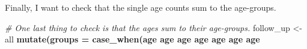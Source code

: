 \documentclass[
]{book}
\newenvironment{Shaded}{\begin{snugshade}}{\end{snugshade}}
\newcommand{\CommentTok}[1]{\textcolor[rgb]{0.56,0.35,0.01}{\textit{#1}}}
\newcommand{\DataTypeTok}[1]{\textcolor[rgb]{0.13,0.29,0.53}{#1}}
\newcommand{\KeywordTok}[1]{\textcolor[rgb]{0.13,0.29,0.53}{\textbf{#1}}}
\newcommand{\NormalTok}[1]{#1}
\newcommand{\OperatorTok}[1]{\textcolor[rgb]{0.81,0.36,0.00}{\textbf{#1}}}
\newcommand{\StringTok}[1]{\textcolor[rgb]{0.31,0.60,0.02}{#1}}
\begin{document}
Finally, I want to check that the single age counts sum to the age-groups.

\begin{Shaded}
\begin{Highlighting}[]
\CommentTok{# One last thing to check is that the ages sum to their age-groups.}
\NormalTok{follow_up <-}\StringTok{ }
\StringTok{  }\NormalTok{all }\OperatorTok{%
\StringTok{  }\KeywordTok{mutate}\NormalTok{(}\DataTypeTok{groups =} \KeywordTok{case_when}\NormalTok{(age }\OperatorTok{%
\NormalTok{                            age }\OperatorTok{%
\NormalTok{                            age }\OperatorTok{%
\NormalTok{                            age }\OperatorTok{%
\NormalTok{                            age }\OperatorTok{%
\NormalTok{                            age }\OperatorTok{%
\NormalTok{                            age }\OperatorTok{%
}}}}}}}}
\end{Highlighting}
\end{Shaded}
\end{document}
